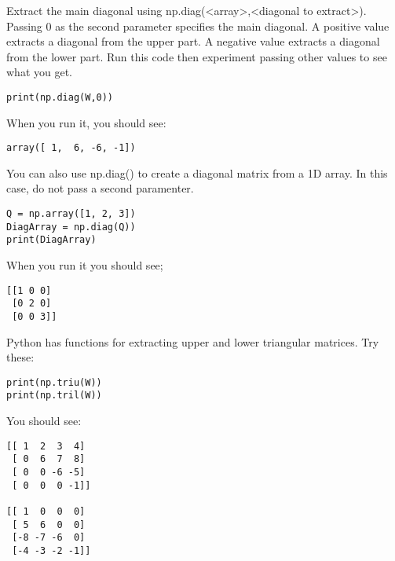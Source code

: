 Extract the main diagonal using np.diag(<array>,<diagonal to extract>). 
Passing 0 as the second parameter specifies the main diagonal. A positive value extracts a diagonal from the upper part. A negative value extracts a diagonal from the lower part. Run this code then experiment passing other values to see what you get.
\begin{Verbatim}
print(np.diag(W,0))
\end{Verbatim}
When you run it, you should see:
\begin{Verbatim}
array([ 1,  6, -6, -1])
\end{Verbatim}
You can also use np.diag() to create a diagonal matrix from a 1D array. In this case, do not pass a second paramenter.
\begin{Verbatim}
Q = np.array([1, 2, 3])
DiagArray = np.diag(Q))
print(DiagArray)
\end{Verbatim}
When you run it you should see;
\begin{Verbatim}
[[1 0 0]
 [0 2 0]
 [0 0 3]]
\end{Verbatim}
Python has functions for extracting upper and lower triangular matrices. Try these:
\begin{Verbatim}
print(np.triu(W))
print(np.tril(W))
\end{Verbatim}
You should see:
\begin{Verbatim}
[[ 1  2  3  4]
 [ 0  6  7  8]
 [ 0  0 -6 -5]
 [ 0  0  0 -1]]
 
[[ 1  0  0  0]
 [ 5  6  0  0]
 [-8 -7 -6  0]
 [-4 -3 -2 -1]]
\end{Verbatim}



